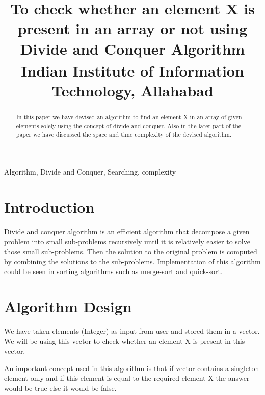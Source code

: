 \documentclass[conference]{IEEEtran}
\begin{document}
\title{To check whether an element X is present in an array or not using Divide and Conquer Algorithm\\
{\footnotesize \textsuperscript {} Indian Institute of Information Technology, Allahabad}
}

\author{
\and
{}
\and
{}
}

\maketitle

\begin{abstract}
 In this paper we have devised an algorithm to find an element X in an array of given elements solely using the concept of divide and conquer. Also in the later part of the paper we have discussed the space and time complexity of the devised algorithm.
\end{abstract}

\begin{IEEEkeywords}
Algorithm, Divide and Conquer, Searching, complexity
\end{IEEEkeywords}

\section{Introduction}
Divide and conquer algorithm is an efficient algorithm that decompose a given problem into small sub-problems recursively until it is relatively easier to solve those small sub-problems. Then the solution to the original problem is computed by combining the solutions to the sub-problems. Implementation of this algorithm could be seen in sorting algorithms such as merge-sort and quick-sort. 

\section{Algorithm Design}
We have taken elements (Integer) as input from user and stored them in a vector. We will be using this vector to check whether an element X is present in this vector.

An important concept used in this algorithm is that if vector contains a singleton element only and if this element is equal to the required element X the answer would be true else it would be false.
\end{document}
